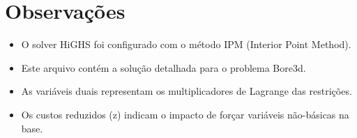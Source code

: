 \documentclass[12pt]{article}
\begin{document}
\section{Observações}

\begin{itemize}
\item O solver HiGHS foi configurado com o método IPM (Interior Point Method).
\item Este arquivo contém a solução detalhada para o problema Bore3d.
\item As variáveis duais representam os multiplicadores de Lagrange das restrições.
\item Os custos reduzidos (z) indicam o impacto de forçar variáveis não-básicas na base.
\end{itemize}
\end{document}
